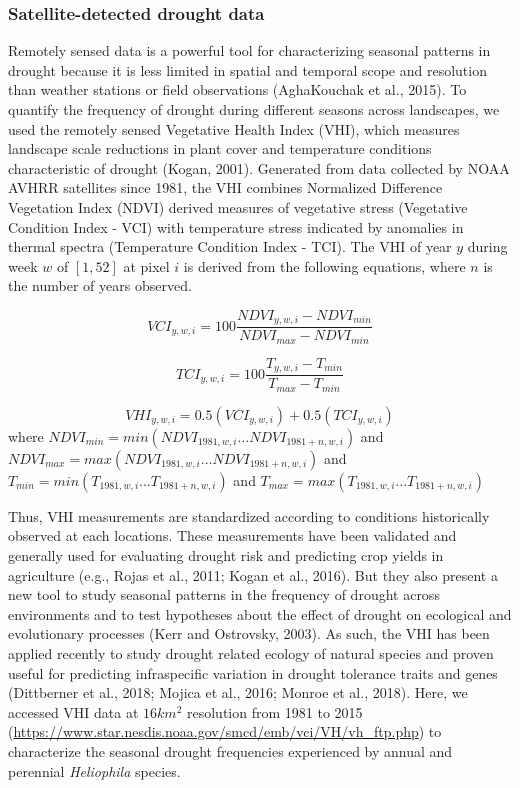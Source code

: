 \documentclass[man,floatsintext]{apa6}
\theoremstyle{definition}
\theoremstyle{definition}
\theoremstyle{definition}
\theoremstyle{remark}
\begin{document}
\hypertarget{satellite-detected-drought-data}{%
\subsubsection{Satellite-detected drought
data}\label{satellite-detected-drought-data}}

Remotely sensed data is a powerful tool for characterizing seasonal
patterns in drought because it is less limited in spatial and temporal
scope and resolution than weather stations or field observations
(AghaKouchak et al., 2015). To quantify the frequency of drought during
different seasons across landscapes, we used the remotely sensed
Vegetative Health Index (VHI), which measures landscape scale reductions
in plant cover and temperature conditions characteristic of drought
(Kogan, 2001). Generated from data collected by NOAA AVHRR satellites
since 1981, the VHI combines Normalized Difference Vegetation Index
(NDVI) derived measures of vegetative stress (Vegetative Condition Index
- VCI) with temperature stress indicated by anomalies in thermal spectra
(Temperature Condition Index - TCI). The VHI of year \(y\) during week
\(w\) of \([1,52]\) at pixel \(i\) is derived from the following
equations, where \(n\) is the number of years observed.

\[VCI_{y,w,i} = 100\frac{NDVI_{y,w,i} - NDVI_{min}}{NDVI_{max} - NDVI_{min}}\]

\[TCI_{y,w,i} = 100\frac{T_{y,w,i} - T_{min}}{T_{max} - T_{min}}\]

\[VHI_{y,w,i} = 0.5(VCI_{y,w,i}) + 0.5(TCI_{y,w,i})\] where
\(NDVI_{min} = min(NDVI_{1981,w,i}...NDVI_{1981+n,w,i})\) and
\(NDVI_{max} = max(NDVI_{1981,w,i}...NDVI_{1981+n,w,i})\) and
\(T_{min} = min(T_{1981,w,i}...T_{1981+n,w,i})\) and
\(T_{max} = max(T_{1981,w,i}...T_{1981+n,w,i})\)

Thus, VHI measurements are standardized according to conditions
historically observed at each locations. These measurements have been
validated and generally used for evaluating drought risk and predicting
crop yields in agriculture (e.g., Rojas et al., 2011; Kogan et al.,
2016). But they also present a new tool to study seasonal patterns in
the frequency of drought across environments and to test hypotheses
about the effect of drought on ecological and evolutionary processes
(Kerr and Ostrovsky, 2003). As such, the VHI has been applied recently
to study drought related ecology of natural species and proven useful
for predicting infraspecific variation in drought tolerance traits and
genes (Dittberner et al., 2018; Mojica et al., 2016; Monroe et al.,
2018). Here, we accessed VHI data at \(16km^2\) resolution from 1981 to
2015 (\url{https://www.star.nesdis.noaa.gov/smcd/emb/vci/VH/vh_ftp.php})
to characterize the seasonal drought frequencies experienced by annual
and perennial \emph{Heliophila} species.
\end{document}

